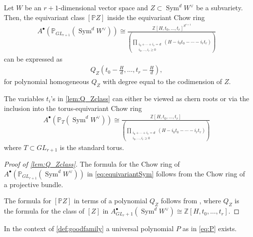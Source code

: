 \documentclass[12pt,reqno]{amsart}
\numberwithin{equation}{section}
\begin{document}
\begin{lemma}
\label{lem:Q_Zclass}
Let $W$ be an $r+1$-dimensional vector space and $Z\subset \operatorname{Sym}^d W^{\vee}$ be a subvariety. Then, the equivariant class $[\mathbb{P}Z]$ inside the equivariant Chow ring 
\begin{align}
    A^{\bullet}(\mathbb{P}_{GL_{r+1}}(\operatorname{Sym}^d W^{\vee}))\cong \frac{\mathbb{Z}[H, t_0,\ldots,t_{r}]^{S^{r+1}}}{\left(\displaystyle\prod_{\substack{i_0+\cdots+i_{r}=d\\ i_0,\ldots,i_r\geq 0}}(H-i_0 t_0 - \cdots - i_r t_r)\right)}\label{eq:equivariantSym}
\end{align}
can be expressed as
\begin{align*}
    Q_Z(t_0-\frac{H}{d},\ldots,t_{r}-\frac{H}{d}),
\end{align*}
for polynomial homogeneous $Q_Z$ with degree equal to the codimension of $Z$. 
\end{lemma}

The variables $t_i$'s in \autoref{lem:Q_Zclass} can either be viewed as chern roots or via the inclusion into the torus-equivariant Chow ring 
\begin{align*}
    A^{\bullet}(\mathbb{P}_{T}(\operatorname{Sym}^d W^{\vee}))\cong \frac{\mathbb{Z}[H, t_0,\ldots,t_{r}]}{\left(\displaystyle\prod_{\substack{i_0+\cdots+i_{r}=d\\ i_0,\ldots,i_r\geq 0}}(H-i_0 t_0 - \cdots - i_r t_r)\right)}
\end{align*}
where $T\subset GL_{r+1}$ is the standard torus.

\begin{proof}[Proof of \autoref{lem:Q_Zclass}]
The formula for the Chow ring of $A^{\bullet}(\mathbb{P}_{GL_{r+1}}(\operatorname{Sym}^d W^{\vee}))$ in \eqref{eq:equivariantSym} follows from the Chow ring of a projective bundle. %

The formula for $[\mathbb{P}Z]$ in terms of a polynomial $Q_Z$ follows from \cite[Theorem 6.1]{FNR05}, where $Q_Z$ is the formula for the class of $[Z]$ in $A^{\bullet}_{GL_r+1}(\operatorname{Sym}^d W^{\vee})\cong \mathbb{Z}[H, t_0,\ldots,t_{r}]$. 
\end{proof}

\begin{proposition}
In the context of \autoref{def:goodfamily} a universal polynomial $P$ as in \eqref{eq:P} exists.
\end{proposition}
\end{document}
